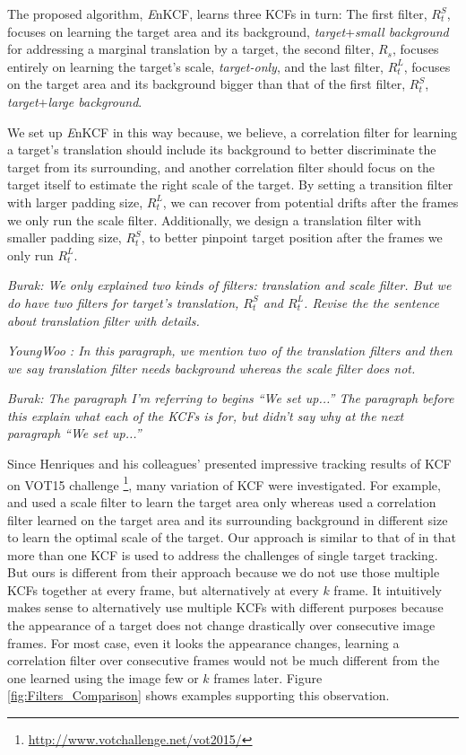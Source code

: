 \documentclass[10pt,twocolumn,letterpaper]{article}
\begin{document}
The proposed algorithm, {\it E}nKCF, learns three KCFs in turn: The
first filter, $R_{t}^{S}$, focuses on learning the target area and its
background, \textit{target}+\textit{small background} for addressing a
marginal translation by a target, the second filter, $R_{s}$, focuses
entirely on learning the target's scale, \textit{target-only}, and the
last filter, $R_{t}^{L}$, focuses on the target area and its
background bigger than that of the first filter, $R_{t}^{S}$,
\textit{target}+\textit{large background}.

We set up {\it E}nKCF in this way because, we believe, a correlation filter for
learning a target's translation should include its background to
better discriminate the target from its surrounding, and another
correlation filter should focus on the target itself to estimate the
right scale of the target. By setting a transition filter with larger padding size, 
$R_{t}^{L}$, we can recover from potential drifts after the frames we only run the
scale filter. Additionally, we design a translation filter with smaller 
padding size, $R_{t}^{S}$, to better pinpoint target position after the 
frames we only run $R_{t}^{L}$.

{\it Burak: We only explained two kinds of
  filters: translation and scale filter. But we do have two filters
  for target's translation, $R_{t}^{S}$ and $R_{t}^{L}$. Revise the
  the sentence about translation filter with details.} 

{\it YoungWoo : In this paragraph, we mention two of the translation
  filters and then we say translation filter needs background whereas
  the scale filter does not.}

{\it Burak: The paragraph I'm referring to begins ``We set up...'' The
  paragraph before this explain what each of the KCFs is for, but
  didn't say why at the next paragraph ``We set up...''}

Since Henriques and his colleagues' presented impressive tracking
results of KCF \cite{henriques2015high} on VOT15
challenge \footnote{\url{http://www.votchallenge.net/vot2015/}}, many
variation of KCF were investigated. For example, \cite{ma2015long} and
\cite{danelljan2014accurate} used a scale filter to learn the target
area only whereas \cite{li2014scale, bibi2015multi, tang2015multi}
used a correlation filter learned on the target area and its
surrounding background in different size to learn the optimal scale of
the target. Our approach is similar to that of \cite{ma2015long} in
that more than one KCF is used to address the challenges of single
target tracking. But ours is different from their approach because we
do not use those multiple KCFs together at every frame, but
alternatively at every $k$ frame. It intuitively makes sense to
alternatively use multiple KCFs with different purposes because the
appearance of a target does not change drastically over consecutive
image frames. For most case, even it looks the appearance changes,
learning a correlation filter over consecutive frames would not be
much different from the one learned using the image few or $k$ frames
later. Figure \ref{fig:Filters_Comparison} shows examples supporting
this observation.
\end{document}
